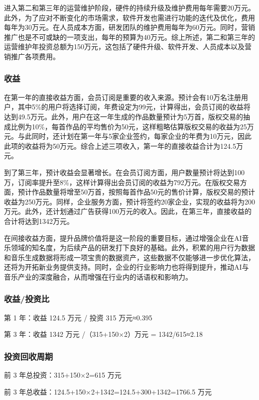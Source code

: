 \documentclass{base}
\numberwithin{figure}{section} %
\begin{document}
进入第二和第三年的运营维护阶段，硬件的持续升级及维护费用每年需要20万元。此外，为了应对不断变化的市场需求，软件开发也需进行功能的迭代及优化，费用每年为30万元。在人员成本方面，研发团队的维护费用每年为60万元。同时，营销推广也是不可或缺的一项支出，每年的预算为40万元。综上所述，第二和第三年的运营维护年投资总额为150万元，这包括了硬件升级、软件开发、人员成本以及营销推广各项费用。

\subsubsection{收益}
在第一年的直接收益方面，会员订阅是重要的收入来源。预计会有10万名注册用户，其中5\%的用户将选择订阅，年费设定为99元，计算得出，会员订阅的收益将达到49.5万元。此外，用户在这一年生成的作品数量预计为5万首，版权交易的抽成比例为10\%，每首作品的平均售价为50元，这样粗略估算版权交易的收益为25万元。与此同时，还计划在第一年与5家企业签约，每家企业的年费为10万元，因此此项的收益将为50万元。综合上述三项收入，第一年的直接收益合计为124.5万元。

到了第三年，预计收益会显著增长。在会员订阅方面，用户数量预计将达到100万，订阅率提升至8\%，这样计算得出会员订阅的收益为792万元。在版权交易方面，预计作品数量将增至50万首，按照每首作品50元的售价计算，版权交易的预计收益为250万元。同样，企业服务方面，预计将签约20家企业，实现的收益将为200万元。此外，还计划通过广告获得100万元的收入。因此，在第三年，直接收益的合计将达到1342万元。

在间接收益方面，提升品牌价值将是这一阶段的重要目标，通过增强企业在AI音乐领域的知名度，为后续产品的研发打下良好的基础。此外，积累的用户行为数据和音乐生成数据将形成一项宝贵的数据资产，这些数据不仅能够进一步优化算法，还将为开拓新业务提供支持。同时，企业的行业影响力也将得到提升，推动AI与音乐产业的深度融合，从而增强在行业内的话语权和影响力。

\subsubsection{收益/投资比}

第 1 年：收益 124.5 万元 / 投资 315 万元≈0.395

第 3 年：收益 1342 万元 /（315+150×2）万元 = 1342/615≈2.18

\subsubsection{投资回收周期}

前 3 年总投资：315+150×2=615 万元

前 3 年总收益：124.5+150×2+1342=124.5+300+1342=1766.5 万元
\end{document}
